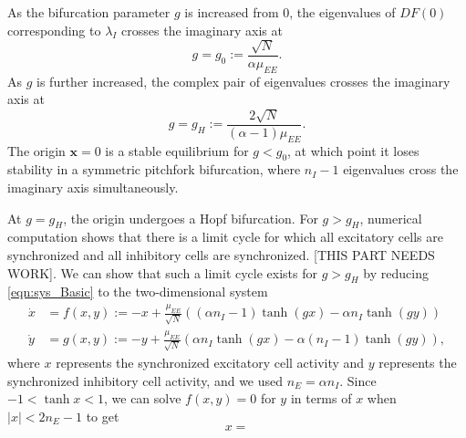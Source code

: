 \documentclass[11pt,reqno]{amsart}
\newcommand{\xvec}{\mathbf{x}}
\begin{document}
As the bifurcation parameter $g$ is increased from 0, the eigenvalues of $DF(0)$ corresponding to $\lambda_I$ crosses the imaginary axis at
\begin{equation}\label{eq:pitchlocation}
    g = g_0 := \frac{\sqrt{N}}{\alpha \mu_{EE}}.
\end{equation}
As $g$ is further increased, the complex pair of eigenvalues crosses the imaginary axis at 
\begin{equation}\label{eq:0hopflocation}
    g= g_H := \frac{ 2\sqrt{N} }{ (\alpha-1)\mu_{EE} }.
\end{equation}
The origin $\xvec = 0$ is a stable equilibrium for $g < g_0$, at which point it loses stability in a symmetric pitchfork bifurcation, where $n_I -1$ eigenvalues cross the imaginary axis simultaneously. 

At $g = g_H$, the origin undergoes a Hopf bifurcation. For $g > g_H$, numerical computation shows that there is a limit cycle for which all excitatory cells are synchronized and all inhibitory cells are synchronized. [THIS PART NEEDS WORK]. We can show that such a limit cycle exists for $g > g_H$ by reducing \cref{eqn:sys_Basic} to the two-dimensional system
\begin{equation}\label{eq:2dsystem}
\begin{aligned}
\dot{x} &= f(x, y) := -x + \frac{\mu_{EE}}{\sqrt{N}}\left((\alpha n_I - 1) \tanh(g x) - \alpha n_I \tanh(g y) \right) \\
\dot{y} &= g(x, y) := -y + \frac{\mu_{EE}}{\sqrt{N}}\left( \alpha n_I \tanh(g x) - \alpha (n_I - 1) \tanh(g y) \right), 
\end{aligned}
\end{equation}
where $x$ represents the synchronized excitatory cell activity and $y$ represents the synchronized inhibitory cell activity, and we used $n_E = \alpha n_I$. Since $-1 < \tanh x < 1$, we can solve $f(x, y) = 0$ for $y$ in terms of $x$ when $|x| < 2 n_E -1$ to get
\[
x = 
\]
\end{document}
